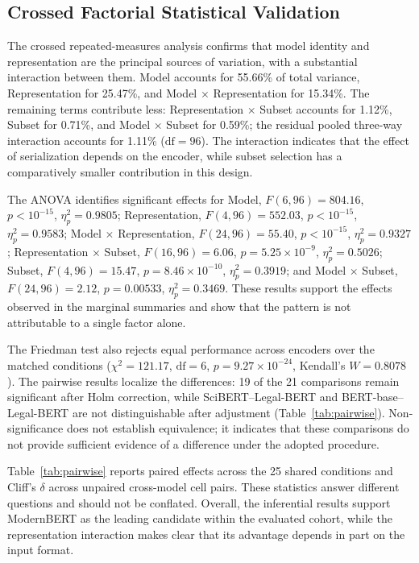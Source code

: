 \subsection{Crossed Factorial Statistical Validation}
\label{sec:stats}

The crossed repeated-measures analysis confirms that model identity and representation are the principal sources of variation, with a substantial interaction between them. Model accounts for 55.66\% of total variance, Representation for 25.47\%, and Model $\times$ Representation for 15.34\%. The remaining terms contribute less: Representation $\times$ Subset accounts for 1.12\%, Subset for 0.71\%, and Model $\times$ Subset for 0.59\%; the residual pooled three-way interaction accounts for 1.11\% ($\mathrm{df}=96$). The interaction indicates that the effect of serialization depends on the encoder, while subset selection has a comparatively smaller contribution in this design.

The ANOVA identifies significant effects for Model, $F(6,96)=804.16$, $p<10^{-15}$, $\eta_p^2=0.9805$; Representation, $F(4,96)=552.03$, $p<10^{-15}$, $\eta_p^2=0.9583$; Model $\times$ Representation, $F(24,96)=55.40$, $p<10^{-15}$, $\eta_p^2=0.9327$; Representation $\times$ Subset, $F(16,96)=6.06$, $p=5.25\times10^{-9}$, $\eta_p^2=0.5026$; Subset, $F(4,96)=15.47$, $p=8.46\times10^{-10}$, $\eta_p^2=0.3919$; and Model $\times$ Subset, $F(24,96)=2.12$, $p=0.00533$, $\eta_p^2=0.3469$. These results support the effects observed in the marginal summaries and show that the pattern is not attributable to a single factor alone.

The Friedman test also rejects equal performance across encoders over the matched conditions ($\chi^2=121.17$, $\mathrm{df}=6$, $p=9.27\times10^{-24}$, Kendall's $W=0.8078$). The pairwise results localize the differences: 19 of the 21 comparisons remain significant after Holm correction, while SciBERT--Legal-BERT and BERT-base--Legal-BERT are not distinguishable after adjustment (Table~\ref{tab:pairwise}). Non-significance does not establish equivalence; it indicates that these comparisons do not provide sufficient evidence of a difference under the adopted procedure.



Table~\ref{tab:pairwise} reports paired effects across the 25 shared conditions and Cliff's $\delta$ across unpaired cross-model cell pairs. These statistics answer different questions and should not be conflated. Overall, the inferential results support ModernBERT as the leading candidate within the evaluated cohort, while the representation interaction makes clear that its advantage depends in part on the input format.

